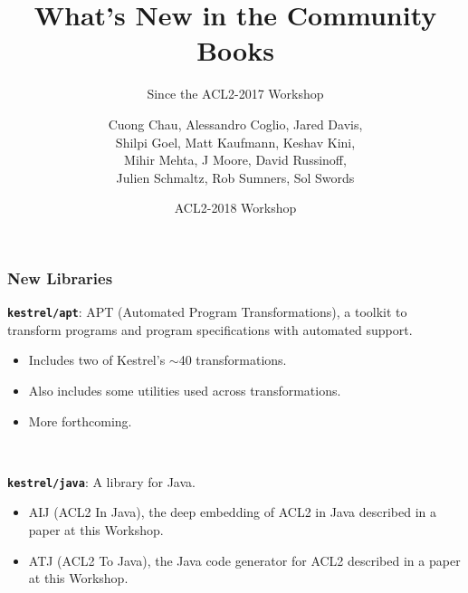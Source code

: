 \documentclass{beamer}
\newcommand{\code}[1]{\texttt{#1}}
\newcommand{\bookpath}[1]{\textbf{\code{#1}}}
\newcommand{\newlibtitle}{\frametitle{New Libraries}}
\begin{document}

\title{What's New in the Community Books}

\subtitle{Since the ACL2-2017 Workshop}

\author{Cuong Chau,
        Alessandro Coglio,
        Jared Davis,
        \\
        Shilpi Goel,
        Matt Kaufmann,
        Keshav Kini,
        \\
        Mihir Mehta,
        J Moore,
        David Russinoff,
        \\
        Julien Schmaltz,
        Rob Sumners,
        Sol Swords}


\date{ACL2-2018 Workshop}



\begin{frame}

\newlibtitle

\bookpath{kestrel/apt}:
APT (Automated Program Transformations),
a toolkit
to transform programs and program specifications with automated support.
\begin{itemize}
\item
Includes two of Kestrel's $\sim$40 transformations.
\item
Also includes some utilities used across transformations.
\item
More forthcoming.
\end{itemize}

\

\bookpath{kestrel/java}:
A library for Java.
\begin{itemize}
\item
AIJ (ACL2 In Java), the deep embedding of ACL2 in Java
described in a paper at this Workshop.
\item
ATJ (ACL2 To Java), the Java code generator for ACL2
described in a paper at this Workshop.
\end{itemize}

\end{frame}
\end{document}
